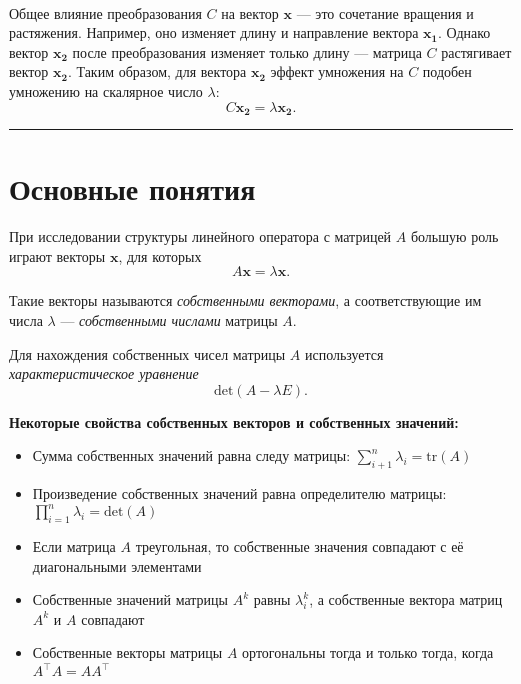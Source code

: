 \documentclass[11pt,a4paper]{article}
\renewcommand{\linethickness}{0.1ex}
\providecommand{\tightlist}{%
      \setlength{\itemsep}{0pt}\setlength{\parskip}{0pt}}
\begin{document}
    \begin{center}
    \end{center}
    { \hspace*{\fill} \\}
    
    Общее влияние преобразования \(C\) на вектор \(\mathbf{x}\) --- это
сочетание вращения и растяжения. Например, оно изменяет длину и
направление вектора \(\mathbf{x_1}\). Однако вектор \(\mathbf{x_2}\)
после преобразования изменяет только длину --- матрица \(C\) растягивает
вектор \(\mathbf{x_2}\). Таким образом, для вектора \(\mathbf{x_2}\)
эффект умножения на \(C\) подобен умножению на скалярное число
\(\lambda\): \[ C\mathbf{x_2} = \lambda \mathbf{x_2}. \]

    \begin{center}\rule{0.5\linewidth}{\linethickness}\end{center}

    \hypertarget{ux43eux441ux43dux43eux432ux43dux44bux435-ux43fux43eux43dux44fux442ux438ux44f}{%
\section{Основные
понятия}\label{ux43eux441ux43dux43eux432ux43dux44bux435-ux43fux43eux43dux44fux442ux438ux44f}}

При исследовании структуры линейного оператора с матрицей \(A\) большую
роль играют векторы \(\mathbf{x}\), для которых
\[ A\mathbf{x} = \lambda\mathbf{x}. \]

Такие векторы называются \emph{собственными векторами}, а
соответствующие им числа \(\lambda\) --- \emph{собственными числами}
матрицы \(A\).

Для нахождения собственных чисел матрицы \(A\) используется
\emph{характеристическое уравнение} \[ \mathrm{det}(A - \lambda E). \]

\textbf{Некоторые свойства собственных векторов и собственных значений:}

\begin{itemize}
\tightlist
\item
  Сумма собственных значений равна следу матрицы:
  \(\sum\limits_{i+1}^{n} \lambda_i = \mathrm{tr}(A)\)
\item
  Произведение собственных значений равна определителю матрицы:
  \(\prod\limits_{i=1}^n \lambda_i = \mathrm{det}(A)\)
\item
  Если матрица \(A\) треугольная, то собственные значения совпадают с её
  диагональными элементами
\item
  Собственные значений матрицы \(A^k\) равны \(\lambda_i^k\), а
  собственные вектора матриц \(A^k\) и \(A\) совпадают
\item
  Собственные векторы матрицы \(A\) ортогональны тогда и только тогда,
  когда \(A^\top A = A A^\top\)
\end{itemize}
\end{document}
